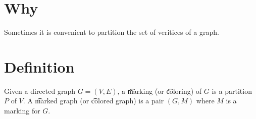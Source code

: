 
\section*{Why}

Sometimes it is convenient to partition the set of veritices of a graph.

\section*{Definition}

Given a directed graph $G = (V, E)$, a \t{marking} (or \t{coloring}) of $G$ is a partition $P$ of $V$.
A \t{marked graph} (or \t{colored graph}) is a pair $(G, M)$ where $M$ is a marking for $G$.

\blankpage